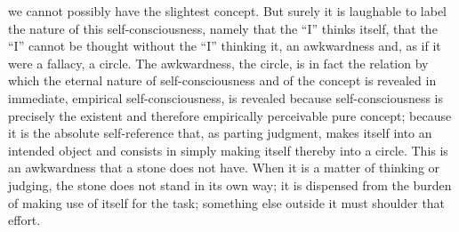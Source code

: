 we cannot possibly have the slightest concept.
But surely it is laughable to label the nature of this self-consciousness,
namely that the “I” thinks itself,
that the “I” cannot be thought without the “I” thinking it,
an awkwardness and, as if it were a fallacy, a circle.
The awkwardness, the circle, is in fact the relation
by which the eternal nature of self-consciousness
and of the concept is revealed in
immediate, empirical self-consciousness,
is revealed because self-consciousness is
precisely the existent and therefore
empirically perceivable pure concept;
because it is the absolute self-reference that,
as parting judgment, makes itself into an intended object
and consists in simply making itself thereby into a circle.
This is an awkwardness that a stone does not have.
When it is a matter of thinking or judging,
the stone does not stand in its own way;
it is dispensed from the burden of making
use of itself for the task;
something else outside it must shoulder that effort.

